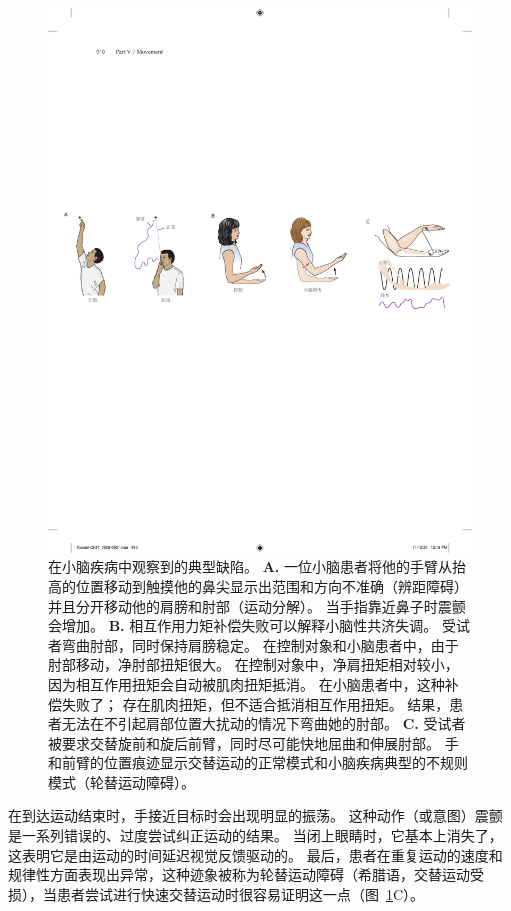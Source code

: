 \begin{figure}[htbp]
	\centering
	\includegraphics[width=1.0\linewidth]{chap37/fig_37_1}
	\caption{在小脑疾病中观察到的典型缺陷。
		\textbf{A.} 一位小脑患者将他的手臂从抬高的位置移动到触摸他的鼻尖显示出范围和方向不准确（辨距障碍）并且分开移动他的肩膀和肘部（运动分解）。 
		当手指靠近鼻子时震颤会增加。 
		\textbf{B.} 相互作用力矩补偿失败可以解释小脑性共济失调。
		受试者弯曲肘部，同时保持肩膀稳定。
		在控制对象和小脑患者中，由于肘部移动，净肘部扭矩很大。
		在控制对象中，净肩扭矩相对较小，因为相互作用扭矩会自动被肌肉扭矩抵消。
		在小脑患者中，这种补偿失败了；
		存在肌肉扭矩，但不适合抵消相互作用扭矩。
		结果，患者无法在不引起肩部位置大扰动的情况下弯曲她的肘部\cite{bastian2000cerebellar}。
		\textbf{C.} 受试者被要求交替旋前和旋后前臂，同时尽可能快地屈曲和伸展肘部。
		手和前臂的位置痕迹显示交替运动的正常模式和小脑疾病典型的不规则模式（轮替运动障碍）。}
	\label{fig:37_1}
\end{figure}


在到达运动结束时，手接近目标时会出现明显的振荡。
这种动作（或意图）震颤是一系列错误的、过度尝试纠正运动的结果。
当闭上眼睛时，它基本上消失了，这表明它是由运动的时间延迟视觉反馈驱动的。
最后，患者在重复运动的速度和规律性方面表现出异常，这种迹象被称为轮替运动障碍（希腊语，交替运动受损），当患者尝试进行快速交替运动时很容易证明这一点（图~\ref{fig:37_1}C）。


